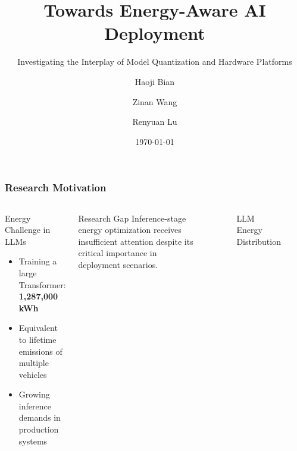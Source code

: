 \documentclass[aspectratio=169,xcolor=dvipsnames]{beamer}
\title{Towards Energy-Aware AI Deployment}
\subtitle{Investigating the Interplay of Model Quantization and Hardware Platforms}
\author{Haoji Bian \and Zinan Wang \and Renyuan Lu}
\institute{Northwestern University}
\date{\today}
\newcommand{\highlight}[1]{\textbf{#1}}
\begin{document}
\begin{frame}
\titlepage
\end{frame}

\begin{frame}
\frametitle{Research Motivation}

\begin{columns}[c]
\begin{block}{Energy Challenge in LLMs}
\begin{itemize}
\item Training a large Transformer: \highlight{1,287,000 kWh}
\item Equivalent to lifetime emissions of multiple vehicles
\item Growing inference demands in production systems
\end{itemize}
\end{block}

\vspace{0.5cm}
\begin{alertblock}{Research Gap}
Inference-stage energy optimization receives insufficient attention despite its critical importance in deployment scenarios.
\end{alertblock}

\begin{figure}
\centering
{}
\caption{LLM Energy Distribution}
\end{figure}

\end{columns}
\end{frame}
\end{document}
